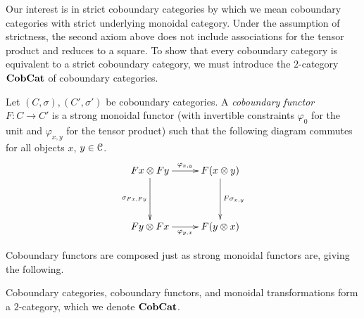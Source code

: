 Our interest is in strict coboundary categories by which we mean coboundary categories with strict underlying monoidal category. Under the assumption of strictness, the second axiom above does not include associations for the tensor product and reduces to a square. To show that every coboundary category is equivalent to a strict coboundary category, we must introduce the $2$-category $\mathbf{CobCat}$ of coboundary categories.

\begin{Defi}
Let $(C,\sigma), (C', \sigma')$ be coboundary categories. A \emph{coboundary functor} $F \colon C \rightarrow C'$ is a strong monoidal functor (with invertible constraints $\varphi_{0}$ for the unit and $\varphi_{x,y}$ for the tensor product) such that the following diagram commutes for all objects $x$, $y \in \mathcal{C}$.
  \[
    \xy
      (0,0)*+{Fx \otimes Fy}="00";
      (25,0)*+{F(x \otimes y)}="10";
      (0,-20)*+{Fy \otimes Fx}="01";
      (25,-20)*+{F(y \otimes x)}="11";
      {\ar^{\varphi_{x,y}} "00";"10"};
      {\ar^{F\sigma_{x,y}} "10";"11"};
      {\ar_{\sigma_{Fx,Fy}} "00";"01"};
      {\ar_{\varphi_{y,x}} "01";"11"};
    \endxy
  \]
\end{Defi}

Coboundary functors are composed just as strong monoidal functors are, giving the following.

\begin{lem}
Coboundary categories, coboundary functors, and monoidal transformations form a $2$-category, which we denote $\mathbf{CobCat}$.
\end{lem}


